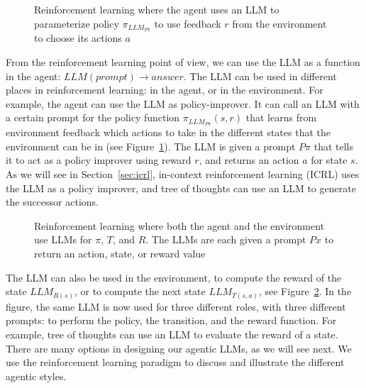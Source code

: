 \begin{figure}
  \begin{center}
    
    \caption{Reinforcement learning where the agent uses an LLM to parameterize  policy $\pi_{LLM_{P\pi}}$ to use feedback $r$ from the environment to choose its actions $a$ }\label{fig:rl-llm}
  \end{center}
\end{figure}

From the reinforcement learning point of view, we can use the  LLM  as a function in the agent: $LLM(prompt) \rightarrow answer$. The LLM can be used in different places in reinforcement learning: in the agent, or in the environment. For example, the agent can use the LLM as policy-improver. It can call an LLM with a certain prompt for the policy function $\pi_{LLM_{P\pi}}(s,r)$ that learns from environment feedback which actions to take in the different states that the environment can be in (see Figure~\ref{fig:rl-llm}). The LLM is given a prompt $P\pi$ that tells it to act as a policy improver  using  reward $r$, and returns an action $a$ for  state $s$. As we will see in Section~\ref{sec:icrl}, in-context reinforcement learning (ICRL) uses the LLM as a policy improver, and tree of thoughts can use an LLM to generate the successor actions. 

\begin{figure}
  \begin{center}
    
    \caption{Reinforcement learning where both the agent and the environment use LLMs for $\pi$, $T$, and $R$. The LLMs are each given a prompt $Px$ to return an action, state, or reward value}\label{fig:rl-llm2}
  \end{center}
\end{figure}

The LLM can also be used in the environment, %
to compute the reward of the state $LLM_{R(s)}$, or to compute the next state  $LLM_{T(s,a)}$, see Figure~\ref{fig:rl-llm2}. In the figure, the same LLM is now used for three different roles, with three different prompts: to perform the policy, the transition, and the reward function. For example, tree of thoughts can use an LLM to evaluate the reward of a state. There are many options in designing our agentic LLMs,
as we will see next. We use the reinforcement learning paradigm to discuss and illustrate the different agentic styles.

 
